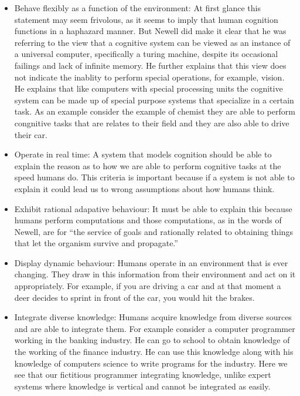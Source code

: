 \begin{itemize} 


\item Behave flexibly as a function of the environment: At first
glance this statement may seem frivolous, as it seems to imply that
human cognition functions in a haphazard manner. But Newell did make it clear
that he was referring to the view that a cognitive system can be
viewed as an instance of a universal computer, specifically a turing
machine, despite its occasional failings and lack of infinite
memory. He further explains that this view does not indicate the
inablity to perform special operations, for example, vision. He
explains that like computers with special processing units the
cognitive system can be made up of special purpose systems that
specialize in a certain task. As an example consider the example of
chemist they are able to perform congnitive tasks that are relates to
their field and they are also able to drive their car. 


\item Operate in real time: A system that models cognition should be
able to explain the reason as to how we are able to perform cognitive
tasks at the speed humans do. This criteria is important because if a
system is not able to explain it could lead us to wrong assumptions
about how humans think.


\item Exhibit rational adapative behaviour: It must be able to explain
this because humans perform computations and those computations, as in the words of
Newell\cite{Newell:1990aa}, are for ``the service of goals and
rationally related to obtaining things that let the organism survive
and propagate.''

\item Display dynamic behaviour: Humans operate in an
environment that is ever changing. They draw in this
information from their environment and act on it appropriately. For
example, if you are driving a car and at that moment a deer decides
to sprint in front of the car, you would hit the brakes. 


\item Integrate diverse knowledge: Humans acquire knowledge from
diverse sources and are able to integrate them. For example consider a
computer programmer working in the banking industry. He can go to
school to obtain knowledge of the working of the finance industry. He
can use this knowledge along with his knowledge of computers science
to write programs for the industry. Here we see that our fictitious
programmer integrating knowledge, unlike expert systems where
knowledge is vertical and cannot be integrated as easily.


\end{itemize}
